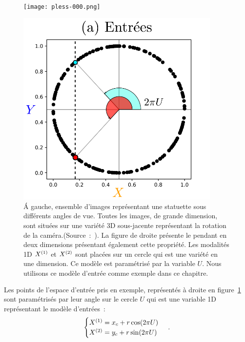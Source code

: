\documentclass[../main]{subfiles}
\begin{document}
\begin{figure}
    \begin{minipage}{0.4\textwidth}
    \centering
    \texttt{[image: pless-000.png]}
    \end{minipage}
    \begin{minipage}{0.6\textwidth}
    \centering
    \includegraphics[width=0.9\textwidth]{2som_inp.pdf}
    \end{minipage}
    \caption{
        \'A gauche, ensemble d'images représentant une statuette sous différents angles de vue. Toutes les images, de grande dimension, sont situées sur une variété 3D sous-jacente représentant la rotation de la caméra.(Source~:~\cite{Pless2009ASO}).
       La figure de droite présente le pendant en deux dimensions présentant également cette propriété. Les modalités 1D $X^{({1})}$ et $X^{({2})}$ sont placées sur un cercle qui est une variété en une dimension. Ce modèle est paramétrisé par la variable $U$. Nous utilisons ce modèle d'entrée comme exemple dans ce chapitre.
       \label{fig:U}}
\end{figure}

Les points de l'espace d'entrée pris en exemple, représentés à droite en figure~\ref{fig:U} sont paramétrisés par leur angle sur le cercle $U$ qui est une variable 1D représentant le modèle d'entrées~:
\begin{equation}
 \begin{cases}
     X^{({1})}= x_c + r  \cos(2\pi U)\\
     X^{({2})} = y_c + r \sin(2 \pi U)
    \end{cases}\,.
\end{equation}
\end{document}
